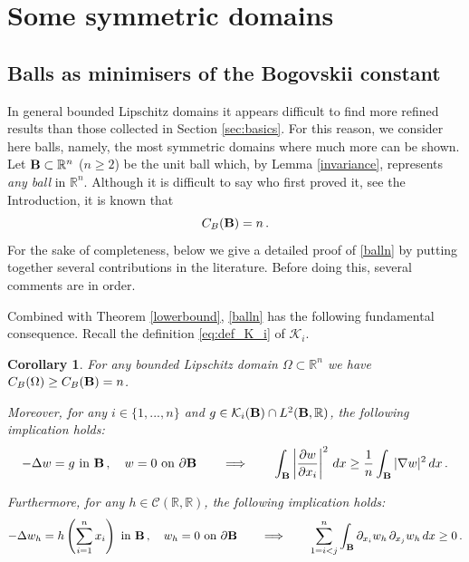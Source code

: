\documentclass[11pt]{article}
\theoremstyle{plain}
\newtheorem{corollary}[theorem]{Corollary}
\theoremstyle{definition}
\numberwithin{equation}{section}
\newcommand{\R}{\mathbb{R}}
\newcommand{\B}{{\bf B}}
\begin{document}
\section{Some symmetric domains}\label{symmBog}

\subsection{Balls as minimisers  of the Bogovskii constant}\label{sec:4_1}

In general bounded Lipschitz domains it appears difficult to find more refined results than those collected in Section
\ref{sec:basics}. For this reason, we consider here balls, namely, the most symmetric domains where much more can be shown. Let $\B\subset\R^n$ ($n\ge2$) be the unit ball which, by Lemma \ref{invariance}, represents {\em any ball} in $\R^n$. Although it is difficult to say who first proved it, see the Introduction, it is known that
\begin{equation}\label{balln}
	C_B(\B)=n\, .
\end{equation}
For the sake of completeness, below we give a detailed proof of \eqref{balln} by putting together several contributions
in the literature. Before doing this, several comments are in order.\par
Combined with Theorem \ref{lowerbound}, \eqref{balln} has the following  fundamental consequence.
Recall the definition \eqref{eq:def_K_i} of $\mathcal{K}_{i}$.

\begin{corollary}\label{ballmin}
	For any bounded Lipschitz domain $\Omega\subset\R^n$ we have $C_B(\Omega)\ge C_B(\B)=n$.\par
	Moreover, for any $i \in \{1,...,n\}$ and $g\in\mathcal{K}_{i}(\B) \cap L^{2}(\B,\R)$, the following implication holds:
	\begin{equation}\label{generalTorsionball}
		- \Delta w = g\mbox{ in }\B\, ,\quad w = 0\mbox{ on }\partial \B\qquad\Longrightarrow\qquad
		\int_\B \left| \dfrac{\partial w}{\partial x_{i}} \right|^2\, dx \geq \frac{1}{n}\int_\B|\nabla w|^2\, dx\, .
	\end{equation}
	
	Furthermore, for any $h\in \mathcal{C}(\R,\R)$, the following implication holds:
	\begin{equation}\label{implication2}
		-\Delta w_h=h\left(\sum_{i=1}^nx_i\right)\mbox{ in }\B\, ,\quad w_h=0\mbox{ on }\partial\B\qquad\Longrightarrow\qquad
		\sum_{1=i<j}^{n}\int_\B \partial_{x_i}w_h\, \partial_{x_j}w_h\, dx\ge0\, .
	\end{equation}
\end{corollary}
\end{document}
